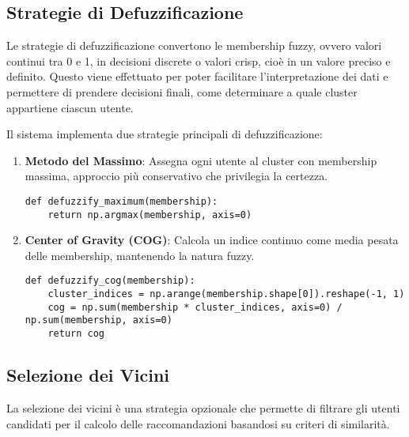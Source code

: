 \subsection{Strategie di Defuzzificazione}

Le strategie di defuzzificazione convertono le membership fuzzy, ovvero valori continui tra 0 e 1, in decisioni discrete o valori crisp, cioè in un valore preciso e definito. Questo viene effettuato per poter facilitare l'interpretazione dei dati e permettere di prendere decisioni finali, come determinare a quale cluster appartiene ciascun utente. 

Il sistema implementa due strategie principali di defuzzificazione:

\begin{enumerate}
    \item \textbf{Metodo del Massimo}: Assegna ogni utente al cluster con membership massima, approccio più conservativo che privilegia la certezza.
\begin{lstlisting}[style=PythonStyle, caption=Defuzzificazione per massimo]
def defuzzify_maximum(membership):
    return np.argmax(membership, axis=0)
\end{lstlisting}
    \item \textbf{Center of Gravity (COG)}: Calcola un indice continuo come media pesata delle membership, mantenendo la natura fuzzy.
\begin{lstlisting}[style=PythonStyle, caption=Defuzzificazione COG]
def defuzzify_cog(membership):
    cluster_indices = np.arange(membership.shape[0]).reshape(-1, 1)
    cog = np.sum(membership * cluster_indices, axis=0) / np.sum(membership, axis=0)
    return cog
\end{lstlisting}
\end{enumerate}

\subsection{Selezione dei Vicini}

La selezione dei vicini è una strategia opzionale che permette di filtrare gli utenti candidati per il calcolo delle raccomandazioni basandosi su criteri di similarità. 

